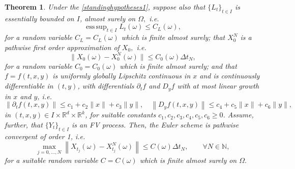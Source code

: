 \documentclass[reqno,12pt]{amsart}
\theoremstyle{plain} %
\newtheorem{theorem}{Theorem}[section]
\theoremstyle{definition} %
\begin{document}
\begin{theorem}
    \label{thmcadlagfv}
    Under the \cref{standinghypotheses1}, suppose also that $\{L_t\}_{t\in I}$ is essentially bounded on $I$, almost surely on $\Omega,$ i.e.
    \begin{equation}
        \label{Ltboundedas}
        \operatorname{ess\,sup}_{t\in I} L_t(\omega) \leq C_L(\omega),
    \end{equation}
    for a random variable $C_L=C_L(\omega)$ which is finite almost surely; that $X_0^N$ is a pathwise first order approximation of $X_0,$ i.e.
    \begin{equation}
        \label{X0conv}
        \|X_0(\omega) - X_0^N(\omega)\| \leq C_0(\omega)\Delta t_N,
    \end{equation}
    for a random variable $C_0=C_0(\omega)$ which is finite almost surely; and that $f=f(t, x, y)$ is uniformly globally Lipschitz continuous in $x$ and is continuously differentiable in $(t, y)$, with differentials $\partial_t f$ and $D_y f$ with at most linear growth in $x$ and $y$, i.e.
    \begin{equation}
        \label{ftfylineargrowthcadlagfv}
        \left\|\partial_t f(t, x, y)\right\| \leq c_1 + c_2 \|x\| + c_3\|y\|, \quad \left\|D_y f(t, x, y)\right\| \leq c_4 + c_5\|x\| + c_6\|y\|,
    \end{equation}
    in $(t, x, y)\in I\times \mathbb{R}^d\times \mathbb{R}^k$, for suitable constants $c_1, c_2, c_3, c_4, c_5, c_6 \geq 0$. Assume, further, that $\{Y_t\}_{t\in I}$ is an FV process. Then, the Euler scheme is pathwise convergent of order 1, i.e.
    \begin{equation}
        \label{ordercadlagfv}
        \max_{j=0, \ldots, N} \left\| X_{t_j}(\omega) - X_{t_j}^N(\omega) \right\| \leq C(\omega) \Delta t_N, \qquad \forall N \in \mathbb{N},
    \end{equation}
    for a suitable random variable $C=C(\omega)$ which is finite almost surely on $\Omega.$
\end{theorem}
\end{document}
